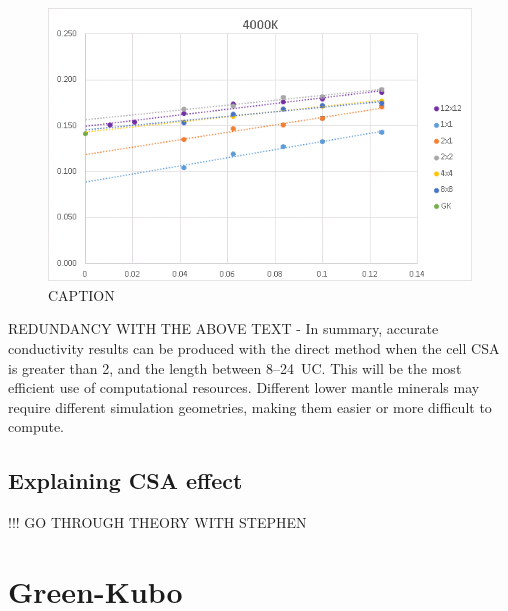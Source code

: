\begin{figure}[h!]
\includegraphics[width=\linewidth]{Figures/direct_inv_cut-up_4000.png}
\caption[direct inv cut up 4000]{CAPTION}
\label{fig:direct_inv_cut-up_4000}
\end{figure}

REDUNDANCY WITH THE ABOVE TEXT - In summary, accurate \bdgs conductivity results can be produced with the direct method when the cell CSA is greater than 2, and the length between 8--24~UC. This will be the most efficient use of computational resources. Different lower mantle minerals may require different simulation geometries, making them easier or more difficult to compute.
















\subsection{\label{sec:3.DM.theory}Explaining CSA effect}

!!! GO THROUGH THEORY WITH STEPHEN


 










\section{\label{sec:3.GK}Green-Kubo}

